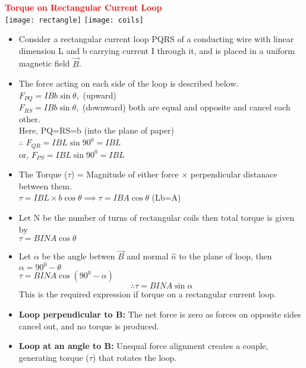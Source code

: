 \documentclass{beamer}
\begin{document}
\begin{frame}
\textcolor{red}{\textbf{Torque on Rectangular Current Loop}}\\
\texttt{[image: rectangle]}
\texttt{[image: coils]}
\begin{itemize}
\item Consider a rectangular current loop PQRS of a conducting wire with linear dimension L and b carrying current I through it, and is placed in a uniform magnetic field $\vec{B}$.
\item The force acting on each side of the loop is described below.\\
\hspace{2cm} $F_{PQ} = IBb \sin\theta,$ (upward)\\
\hspace{2cm} $F_{RS} = IBb \sin\theta,$ (downward) both are equal and opposite and cancel each other.\\
\hspace{1cm} Here, PQ=RS=b (into the plane of paper) \\
$\therefore$ $F_{QR}=IBL\sin 90^0=IBL$\\
or,   $F_{PS}=IBL\sin 90^0=IBL$\\

\end{itemize}
\end{frame}

\begin{frame}
\begin{itemize}
\item The Torque ($\tau$) = Magnitude of either force $\times$ perpendicular distanace between them.\\
\hspace{2cm} $\tau=IBL\times b\cos\theta  \implies \tau=IBA\cos\theta$ (Lb=A)\\
\item Let N be the number of turns of rectangular coils then total torque is given by \\
\hspace{4cm} $\tau=BINA\cos\theta$
\item Let $\alpha$ be the angle betwen $\vec{B}$ and normal $\hat{n}$ to  the plane of loop, then $\alpha=90^0-\theta$\\
\hspace{3cm} $\tau=BINA\cos(90^0-\alpha)$\\
\begin{equation}
\therefore \tau= BINA\sin\alpha
\end{equation}
This is the required expression if torque on a rectangular current loop.

\item \textbf{Loop perpendicular to B:} The net force is zero as forces on opposite sides cancel out, and no torque is produced.
\item \textbf{Loop at an angle to B:} Unequal force alignment creates a couple, generating torque ($\tau$) that rotates the loop.
\end{itemize}

\end{frame}
\end{document}
